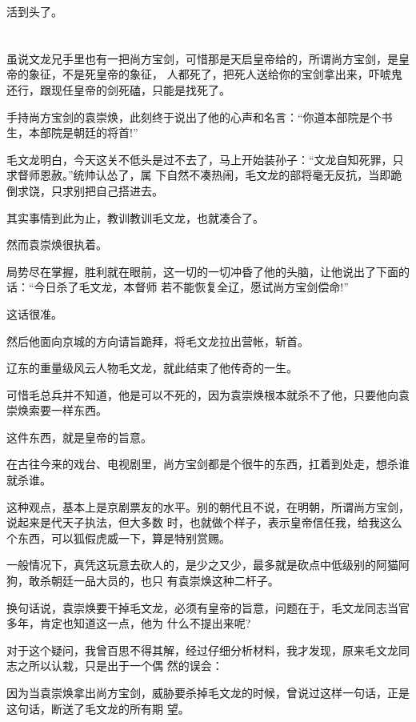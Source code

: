 \documentclass[11pt,a4paper,onecolumn]{article}
\begin{document}
活到头了。

\section[\thesection]{}

虽说文龙兄手里也有一把尚方宝剑，可惜那是天启皇帝给的，所谓尚方宝剑，是皇帝的象征，不是死皇帝的象征，
人都死了，把死人送给你的宝剑拿出来，吓唬鬼还行，跟现任皇帝的剑死磕，只能是找死了。

手持尚方宝剑的袁崇焕，此刻终于说出了他的心声和名言：``你道本部院是个书生，本部院是朝廷的将首!''

毛文龙明白，今天这关不低头是过不去了，马上开始装孙子：``文龙自知死罪，只求督师恩赦。''统帅认怂了，属
下自然不凑热闹，毛文龙的部将毫无反抗，当即跪倒求饶，只求别把自己搭进去。

其实事情到此为止，教训教训毛文龙，也就凑合了。

然而袁崇焕很执着。

局势尽在掌握，胜利就在眼前，这一切的一切冲昏了他的头脑，让他说出了下面的话：``今日杀了毛文龙，本督师
若不能恢复全辽，愿试尚方宝剑偿命!''

这话很准。

然后他面向京城的方向请旨跪拜，将毛文龙拉出营帐，斩首。

辽东的重量级风云人物毛文龙，就此结束了他传奇的一生。

可惜毛总兵并不知道，他是可以不死的，因为袁崇焕根本就杀不了他，只要他向袁崇焕索要一样东西。

这件东西，就是皇帝的旨意。

在古往今来的戏台、电视剧里，尚方宝剑都是个很牛的东西，扛着到处走，想杀谁就杀谁。

这种观点，基本上是京剧票友的水平。别的朝代且不说，在明朝，所谓尚方宝剑，说起来是代天子执法，但大多数
时，也就做个样子，表示皇帝信任我，给我这么个东西，可以狐假虎威一下，算是特别赏赐。

一般情况下，真凭这玩意去砍人的，是少之又少，最多就是砍点中低级别的阿猫阿狗，敢杀朝廷一品大员的，也只
有袁崇焕这种二杆子。

换句话说，袁崇焕要干掉毛文龙，必须有皇帝的旨意，问题在于，毛文龙同志当官多年，肯定也知道这一点，他为
什么不提出来呢?

对于这个疑问，我曾百思不得其解，经过仔细分析材料，我才发现，原来毛文龙同志之所以认栽，只是出于一个偶
然的误会：

因为当袁崇焕拿出尚方宝剑，威胁要杀掉毛文龙的时候，曾说过这样一句话，正是这句话，断送了毛文龙的所有期
望。

\section[\thesection]{}
\end{document}
